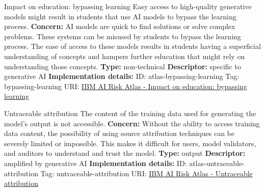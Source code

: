 \begin{definitionbox}{Impact on education: bypassing learning}
Easy access to high-quality generative models might result in students that use AI models to bypass the learning process.\newline\newline
\textbf{Concern: }AI models are quick to find solutions or solve complex problems. These systems can be misused by students to bypass the learning process. The ease of access to these models results in students having a superficial understanding of concepts and hampers further education that might rely on understanding those concepts.\newline\newline
\textbf{Type: }non-technical\newline
\textbf{Descriptor: }specific to generative AI \newline\newline
\textbf{Implementation details: } \newline
ID: atlas-bypassing-learning \newline
Tag: bypassing-learning \newline
URI:  \href{https://www.ibm.com/docs/en/watsonx/saas?topic=SSYOK8/wsj/ai-risk-atlas/bypassing-learning.html}{IBM AI Risk Atlas - Impact on education: bypassing learning}\newline
\end{definitionbox}
\begin{definitionbox}{Untraceable attribution}
The content of the training data used for generating the model's output is not accessible.\newline\newline
\textbf{Concern: }Without the ability to access training data content, the possibility of using source attribution techniques can be severely limited or impossible. This makes it difficult for users, model validators, and auditors to understand and trust the model.\newline\newline
\textbf{Type: }output\newline
\textbf{Descriptor: }amplified by generative AI \newline\newline
\textbf{Implementation details: } \newline
ID: atlas-untraceable-attribution \newline
Tag: untraceable-attribution \newline
URI:  \href{https://www.ibm.com/docs/en/watsonx/saas?topic=SSYOK8/wsj/ai-risk-atlas/untraceable-attribution.html}{IBM AI Risk Atlas - Untraceable attribution}\newline
\end{definitionbox}
